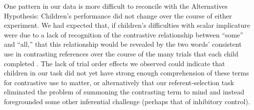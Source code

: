 \documentclass[man]{apa2}
\begin{document}
{One pattern in our data is more difficult to reconcile with the Alternatives Hypothesis: Children's performance did not change over the course of either experiment. We had expected that, if children's difficulties with scalar implicature were due to a lack of recognition of the contrastive relationship between ``some'' and ``all,'' that this relationship would be revealed by the two words' consistent use in contrasting references over the course of the many trials that each child completed  \cite{skordos2014}. 
The lack of trial order effects we observed could indicate that children in our task did not yet have strong enough comprehension of these terms for contrastive use to matter, or alternatively that our referent-selection task eliminated the problem of summoning the contrasting term to mind and instead foregrounded some other inferential challenge (perhaps that of inhibitory control). 





}
\end{document}
